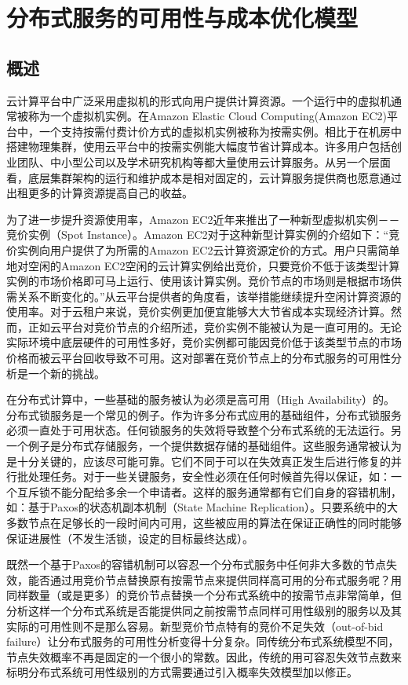 \chapter{分布式服务的可用性与成本优化模型}
\label{cha:jupiter}

\section{概述}
\label{sec:jupiter_intro}
云计算平台中广泛采用虚拟机的形式向用户提供计算资源。一个运行中的虚拟机通常被称为一个虚拟机实例。在Amazon Elastic Cloud Computing(Amazon EC2)平台中，一个支持按需付费计价方式的虚拟机实例被称为按需实例。相比于在机房中搭建物理集群，使用云平台中的按需实例能大幅度节省计算成本。许多用户包括创业团队、中小型公司以及学术研究机构等都大量使用云计算服务。从另一个层面看，底层集群架构的运行和维护成本是相对固定的，云计算服务提供商也愿意通过出租更多的计算资源提高自己的收益。

为了进一步提升资源使用率，Amazon EC2近年来推出了一种新型虚拟机实例－－竞价实例（Spot Instance）。Amazon EC2对于这种新型计算实例的介绍如下：``竞价实例向用户提供了为所需的Amazon EC2云计算资源定价的方式。用户只需简单地对空闲的Amazon EC2空闲的云计算实例给出竞价，只要竞价不低于该类型计算实例的市场价格即可马上运行、使用该计算实例。竞价节点的市场则是根据市场供需关系不断变化的。''从云平台提供者的角度看，该举措能继续提升空闲计算资源的使用率。对于云租户来说，竞价实例更加便宜能够大大节省成本实现经济计算。然而，正如云平台对竞价节点的介绍所述，竞价实例不能被认为是一直可用的。无论实际环境中底层硬件的可用性多好，竞价实例都可能因竞价低于该类型节点的市场价格而被云平台回收导致不可用。这对部署在竞价节点上的分布式服务的可用性分析是一个新的挑战。

在分布式计算中，一些基础的服务被认为必须是高可用（High Availability）的。分布式锁服务是一个常见的例子。作为许多分布式应用的基础组件，分布式锁服务必须一直处于可用状态。任何锁服务的失效将导致整个分布式系统的无法运行。另一个例子是分布式存储服务，一个提供数据存储的基础组件。这些服务通常被认为是十分关键的，应该尽可能可靠。它们不同于可以在失效真正发生后进行修复的并行批处理任务\cite{Liu:2011:CMC:2170444.2170450, 5975137, Yi:2010:RCS:1844768.1845343}。对于一些关键服务，安全性必须在任何时候首先得以保证，如：一个互斥锁不能分配给多余一个申请者。这样的服务通常都有它们自身的容错机制，如：基于Paxos的状态机副本机制（State Machine Replication）。只要系统中的大多数节点在足够长的一段时间内可用，这些被应用的算法在保证正确性的同时能够保证进展性（不发生活锁，设定的目标最终达成）。

既然一个基于Paxos的容错机制可以容忍一个分布式服务中任何非大多数的节点失效，能否通过用竞价节点替换原有按需节点来提供同样高可用的分布式服务呢？用同样数量（或是更多）的竞价节点替换一个分布式系统中的按需节点非常简单，但分析这样一个分布式系统是否能提供同之前按需节点同样可用性级别的服务以及其实际的可用性则不是那么容易。新型竞价节点特有的竞价不足失效（out-of-bid failure）让分布式服务的可用性分析变得十分复杂。同传统分布式系统模型不同，节点失效概率不再是固定的一个很小的常数。因此，传统的用可容忍失效节点数来标明分布式系统可用性级别的方式需要通过引入概率失效模型加以修正。

